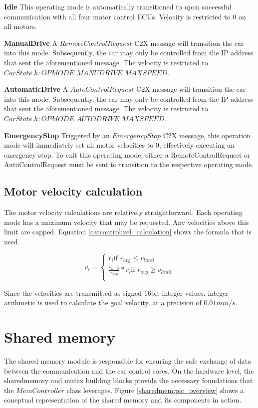 \textbf{Idle} This operating mode is automatically transitioned to upon successful communication with all four motor control ECUs. Velocity is restricted to 0 on all motors.

\textbf{ManualDrive} A $RemoteControlRequest$ C2X message will transition the car into this mode. Subsequently, the car may only be controlled from the IP address that sent the aforementioned message. The velocity is restricted to $CarState.h:OPMODE\_MANUDRIVE\_MAXSPEED$.

\textbf{AutomaticDrive} A $AutoControlRequest$ C2X message will transition the car into this mode. Subsequently, the car may only be controlled from the IP address that sent the aforementioned message. The velocity is restricted to $CarState.h:OPMODE\_AUTODRIVE\_MAXSPEED$.

\textbf{EmergencyStop} Triggered by an $EmergencyStop$ C2X message, this operation mode will immediately set all motor velocities to 0, effectively executing an emergency stop. To exit this operating mode, either a RemoteControlRequest or AutoControlRequest must be sent to transition to the respective operating mode.

\subsection{Motor velocity calculation}
The motor velocity calculations are relatively straightforward. Each operating mode has a maximum velocity that may be requested. Any velocities above this limit are capped. Equation \ref{carcontrol:vel_calculation} shows the formula that is used.

\label{carcontrol:vel_calculation}
\begin{equation}
v_{i} = 
\begin{cases} 
r_{i} \mbox{if } r_{avg} \leq v_{limit} \\
\frac{v_{limit}}{r_{avg}} * r_{i} \mbox{if } r_{avg} \ge v_{limit} \\
\end{cases}
\end{equation}

Since the velocities are transmitted as signed 16bit integer values, integer arithmetic is used to calculate the goal velocity, at a precision of $0.01mm/s$.

\section{Shared memory}
The shared memory module is responsible for ensuring the safe exchange of data between the communication and the car control cores. On the hardware level, the sharedmemory and mutex building blocks provide the necessary foundations that the \textbf{$MemController$} class leverages. Figure \ref{sharedmem:pic_overview} shows a coneptual representation of the shared memory and its components in action.

